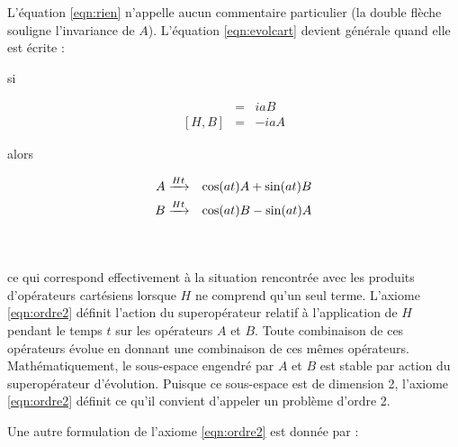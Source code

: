 L'équation \ref{eqn:rien} n'appelle aucun commentaire particulier
(la double flèche souligne l'invariance de $A$).
L'équation \ref{eqn:evolcart} devient générale quand elle est écrite :

\noindent
\begin{minipage}{0.5cm}si\end{minipage}
\hfill
\parbox{3.5cm}
{\begin{eqnarray*} [H,A] & = & iaB \\ {[H,B]} & = & -iaA \end{eqnarray*}}
\hfill\hfill
\begin{minipage}{0.5cm}alors\end{minipage}
\hfill
\parbox{8cm}{
\begin{eqnarray*}
A & \xrightarrow{Ht} & \cos(at)A + \sin(at)B \\
B & \xrightarrow{Ht} & \cos(at)B - \sin(at)A
\end{eqnarray*}}
\parbox{1cm}{\begin{eqnarray}\label{eqn:ordre2}\end{eqnarray}}
\\
\noindent
ce qui correspond effectivement à la situation rencontrée avec
les produits d'opérateurs cartésiens lorsque $H$ ne comprend
qu'un seul terme.
L'axiome \ref{eqn:ordre2} définit l'action du superopérateur
relatif à l'application de $H$ pendant le temps $t$ sur les opérateurs
$A$ et $B$.
Toute combinaison de ces opérateurs évolue en donnant une combinaison de ces
mêmes opérateurs.
Mathématiquement, le sous-espace engendré par $A$ et $B$ est stable
par action du superopérateur d'évolution.
Puisque ce sous-espace est de dimension 2, l'axiome \ref{eqn:ordre2}
définit ce qu'il convient d'appeler un problème d'ordre 2.

Une autre formulation de l'axiome \ref{eqn:ordre2} est donnée par :

